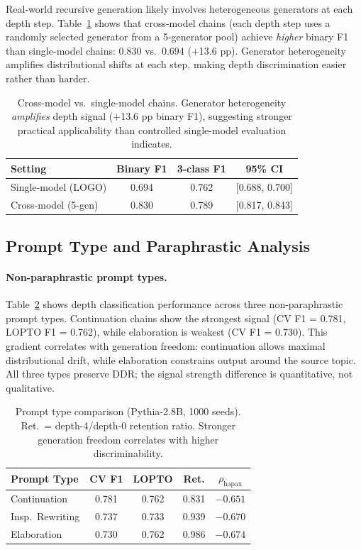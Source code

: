 \documentclass[11pt]{article}
\begin{document}
Real-world recursive generation likely involves heterogeneous generators at each depth step. Table~\ref{tab:crossmodel} shows that cross-model chains (each depth step uses a randomly selected generator from a 5-generator pool) achieve \emph{higher} binary F1 than single-model chains: 0.830 vs.\ 0.694 ($+$13.6 pp). Generator heterogeneity amplifies distributional shifts at each step, making depth discrimination easier rather than harder.

\begin{table}[t]
\centering
\small
\begin{tabular}{lccc}
\toprule
\textbf{Setting} & \textbf{Binary F1} & \textbf{3-class F1} & \textbf{95\% CI} \\
\midrule
Single-model (LOGO) & 0.694 & 0.762 & [0.688, 0.700] \\
Cross-model (5-gen) & 0.830 & 0.789 & [0.817, 0.843] \\
\bottomrule
\end{tabular}
\caption{Cross-model vs.\ single-model chains. Generator heterogeneity \emph{amplifies} depth signal ($+$13.6 pp binary F1), suggesting stronger practical applicability than controlled single-model evaluation indicates.}
\label{tab:crossmodel}
\end{table}

\subsection{Prompt Type and Paraphrastic Analysis}
\label{sec:prompt}

\paragraph{Non-paraphrastic prompt types.}
Table~\ref{tab:prompt} shows depth classification performance across three non-paraphrastic prompt types. Continuation chains show the strongest signal (CV F1 = 0.781, LOPTO F1 = 0.762), while elaboration is weakest (CV F1 = 0.730). This gradient correlates with generation freedom: continuation allows maximal distributional drift, while elaboration constrains output around the source topic. All three types preserve DDR; the signal strength difference is quantitative, not qualitative.

\begin{table}[t]
\centering
\small
\begin{tabular}{lcccc}
\toprule
\textbf{Prompt Type} & \textbf{CV F1} & \textbf{LOPTO} & \textbf{Ret.} & \textbf{$\rho_{\mathrm{hapax}}$} \\
\midrule
Continuation & 0.781 & 0.762 & 0.831 & $-0.651$ \\
Insp.\ Rewriting & 0.737 & 0.733 & 0.939 & $-0.670$ \\
Elaboration & 0.730 & 0.762 & 0.986 & $-0.674$ \\
\bottomrule
\end{tabular}
\caption{Prompt type comparison (Pythia-2.8B, 1000 seeds). Ret.\ = depth-4/depth-0 retention ratio. Stronger generation freedom correlates with higher discriminability.}
\label{tab:prompt}
\end{table}
\end{document}
